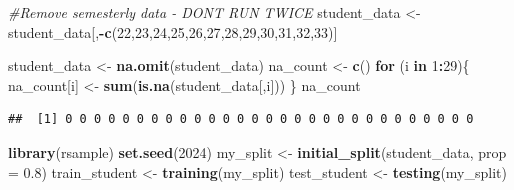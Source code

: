 \documentclass[
]{article}
\newenvironment{Shaded}{\begin{snugshade}}{\end{snugshade}}
\newcommand{\AttributeTok}[1]{\textcolor[rgb]{0.13,0.29,0.53}{#1}}
\newcommand{\CommentTok}[1]{\textcolor[rgb]{0.56,0.35,0.01}{\textit{#1}}}
\newcommand{\ControlFlowTok}[1]{\textcolor[rgb]{0.13,0.29,0.53}{\textbf{#1}}}
\newcommand{\DecValTok}[1]{\textcolor[rgb]{0.00,0.00,0.81}{#1}}
\newcommand{\FloatTok}[1]{\textcolor[rgb]{0.00,0.00,0.81}{#1}}
\newcommand{\FunctionTok}[1]{\textcolor[rgb]{0.13,0.29,0.53}{\textbf{#1}}}
\newcommand{\NormalTok}[1]{#1}
\newcommand{\OtherTok}[1]{\textcolor[rgb]{0.56,0.35,0.01}{#1}}
\newcommand{\SpecialCharTok}[1]{\textcolor[rgb]{0.81,0.36,0.00}{\textbf{#1}}}
\begin{document}
\begin{Shaded}
\begin{Highlighting}[]
\CommentTok{\#Remove semesterly data {-} DON\textquotesingle{}T RUN TWICE}
\NormalTok{student\_data }\OtherTok{\textless{}{-}}\NormalTok{ student\_data[,}\SpecialCharTok{{-}}\FunctionTok{c}\NormalTok{(}\DecValTok{22}\NormalTok{,}\DecValTok{23}\NormalTok{,}\DecValTok{24}\NormalTok{,}\DecValTok{25}\NormalTok{,}\DecValTok{26}\NormalTok{,}\DecValTok{27}\NormalTok{,}\DecValTok{28}\NormalTok{,}\DecValTok{29}\NormalTok{,}\DecValTok{30}\NormalTok{,}\DecValTok{31}\NormalTok{,}\DecValTok{32}\NormalTok{,}\DecValTok{33}\NormalTok{)]}
\end{Highlighting}
\end{Shaded}

\begin{Shaded}
\begin{Highlighting}[]
\NormalTok{student\_data }\OtherTok{\textless{}{-}} \FunctionTok{na.omit}\NormalTok{(student\_data)}
\NormalTok{na\_count }\OtherTok{\textless{}{-}} \FunctionTok{c}\NormalTok{()}
\ControlFlowTok{for}\NormalTok{ (i }\ControlFlowTok{in} \DecValTok{1}\SpecialCharTok{:}\DecValTok{29}\NormalTok{)\{}
\NormalTok{  na\_count[i] }\OtherTok{\textless{}{-}} \FunctionTok{sum}\NormalTok{(}\FunctionTok{is.na}\NormalTok{(student\_data[,i]))}
\NormalTok{\}}
\NormalTok{na\_count}
\end{Highlighting}
\end{Shaded}

\begin{verbatim}
##  [1] 0 0 0 0 0 0 0 0 0 0 0 0 0 0 0 0 0 0 0 0 0 0 0 0 0 0 0 0 0
\end{verbatim}

\begin{Shaded}
\end{Shaded}

\begin{Shaded}
\begin{Highlighting}[]
\FunctionTok{library}\NormalTok{(rsample)}
\FunctionTok{set.seed}\NormalTok{(}\DecValTok{2024}\NormalTok{)}
\NormalTok{my\_split }\OtherTok{\textless{}{-}} \FunctionTok{initial\_split}\NormalTok{(student\_data, }\AttributeTok{prop =} \FloatTok{0.8}\NormalTok{)}
\NormalTok{train\_student }\OtherTok{\textless{}{-}} \FunctionTok{training}\NormalTok{(my\_split)}
\NormalTok{test\_student }\OtherTok{\textless{}{-}} \FunctionTok{testing}\NormalTok{(my\_split)}
\end{Highlighting}
\end{Shaded}
\end{document}
